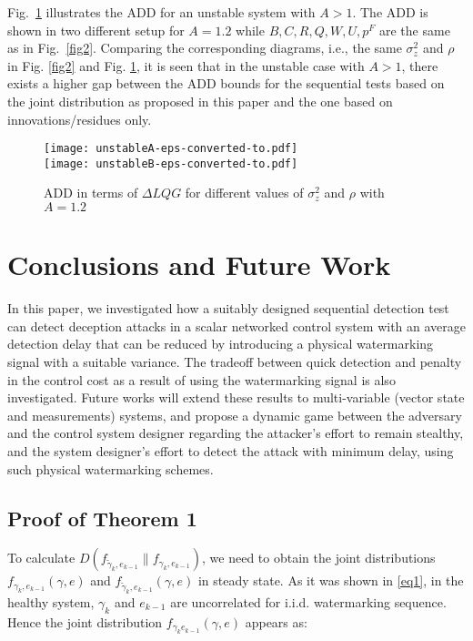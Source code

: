 \documentclass[journal,10pt]{IEEEtran}
\begin{document}
Fig.~\ref{fig3} illustrates the ADD for an unstable system with $A>1$. The ADD is shown in two different
setup for $A=1.2$ while $B,C,R,Q,W,U,p^{F}$ are the same as in
Fig.~\ref{fig2}. Comparing the corresponding diagrams, i.e., the same
$\sigma_{z}^{2}$ and $\rho$ in Fig. \ref{fig2} and Fig. \ref{fig3}, it is seen  that in
the unstable case with $A>1$, there exists a higher gap between the ADD bounds for the sequential tests based on the joint distribution as proposed in this paper and
the one based on innovations/residues only.
\begin{figure}[htbp]
\centering
\texttt{[image: unstableA-eps-converted-to.pdf]}
\\
\texttt{[image: unstableB-eps-converted-to.pdf]}
 \caption{\footnotesize{\footnotesize{ADD in terms of $\Delta LQG$ for different values of $\sigma_{z}^{2}$ and $\rho$ with $A=1.2$}} }
\label{fig3}
\end{figure}

\section{Conclusions and Future Work}
In this paper, we investigated how a suitably designed sequential detection test can detect deception attacks in a scalar networked control system with an average detection delay that can be reduced by introducing a physical watermarking signal with a suitable variance. The tradeoff between quick detection and penalty in the control cost as a result of using the watermarking signal is also investigated. Future works will extend these results to multi-variable (vector state and measurements) systems, and propose a  dynamic game between the adversary and the control system designer regarding the attacker's effort to remain stealthy, and the system designer's effort to detect the attack with minimum delay, using such physical watermarking schemes. 
\appendix
\subsection{Proof of Theorem 1}
To calculate $D(f_{\widetilde{\gamma}_{k}, e_{k-1}}\|f_{\gamma_{k}, e_{k-1}})$, we need to obtain the joint
distributions $f_{\gamma_{k}, e_{k-1}}(\gamma,e)$ and
$f_{\widetilde{\gamma}_{k}, e_{k-1}}(\gamma,e)$ in steady state. As it
was shown in \eqref{eq1}, in the healthy system, $\gamma_{k}$ and
$e_{k-1}$ are uncorrelated for i.i.d. watermarking sequence. Hence
the joint distribution $f_{\gamma_{k}e_{k-1}}(\gamma,e)$ appears as:
\end{document}
